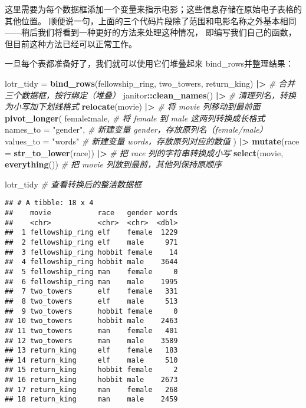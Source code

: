 \documentclass[
]{article}
\newenvironment{Shaded}{\begin{snugshade}}{\end{snugshade}}
\newcommand{\AttributeTok}[1]{\textcolor[rgb]{0.13,0.29,0.53}{#1}}
\newcommand{\CommentTok}[1]{\textcolor[rgb]{0.56,0.35,0.01}{\textit{#1}}}
\newcommand{\FunctionTok}[1]{\textcolor[rgb]{0.13,0.29,0.53}{\textbf{#1}}}
\newcommand{\NormalTok}[1]{#1}
\newcommand{\OtherTok}[1]{\textcolor[rgb]{0.56,0.35,0.01}{#1}}
\newcommand{\SpecialCharTok}[1]{\textcolor[rgb]{0.81,0.36,0.00}{\textbf{#1}}}
\newcommand{\StringTok}[1]{\textcolor[rgb]{0.31,0.60,0.02}{#1}}
\begin{document}
这里需要为每个数据框添加一个变量来指示电影；这些信息存储在原始电子表格的其他位置。
顺便说一句，上面的三个代码片段除了范围和电影名称之外基本相同------稍后我们将看到一种更好的方法来处理这种情况，
即编写我们自己的函数，但目前这种方法已经可以正常工作。

一旦每个表都准备好了，我们就可以使用它们堆叠起来 bind\_rows并整理结果：

\begin{Shaded}
\begin{Highlighting}[]
\NormalTok{lotr\_tidy }\OtherTok{=} 
  \FunctionTok{bind\_rows}\NormalTok{(fellowship\_ring, two\_towers, return\_king) }\SpecialCharTok{|\textgreater{}}        \CommentTok{\# 合并三个数据框，按行绑定（堆叠）}
\NormalTok{  janitor}\SpecialCharTok{::}\FunctionTok{clean\_names}\NormalTok{() }\SpecialCharTok{|\textgreater{}}                                     \CommentTok{\# 清理列名，转换为小写加下划线格式}
  \FunctionTok{relocate}\NormalTok{(movie) }\SpecialCharTok{|\textgreater{}}                                            \CommentTok{\# 将 movie 列移动到最前面}
  \FunctionTok{pivot\_longer}\NormalTok{(}
\NormalTok{    female}\SpecialCharTok{:}\NormalTok{male,                                                }\CommentTok{\# 将 female 到 male 这两列转换成长格式}
    \AttributeTok{names\_to =} \StringTok{"gender"}\NormalTok{,                                        }\CommentTok{\# 新建变量 gender，存放原列名（female/male）}
    \AttributeTok{values\_to =} \StringTok{"words"}                                         \CommentTok{\# 新建变量 words，存放原列对应的数值}
\NormalTok{  ) }\SpecialCharTok{|\textgreater{}} 
  \FunctionTok{mutate}\NormalTok{(}\AttributeTok{race =} \FunctionTok{str\_to\_lower}\NormalTok{(race)) }\SpecialCharTok{|\textgreater{}}                         \CommentTok{\# 把 race 列的字符串转换成小写}
  \FunctionTok{select}\NormalTok{(movie, }\FunctionTok{everything}\NormalTok{())                                  }\CommentTok{\# 把 movie 列放到最前，其他列保持原顺序}

\NormalTok{lotr\_tidy                                                    }\CommentTok{\# 查看转换后的整洁数据框}
\end{Highlighting}
\end{Shaded}

\begin{verbatim}
## # A tibble: 18 x 4
##    movie           race   gender words
##    <chr>           <chr>  <chr>  <dbl>
##  1 fellowship_ring elf    female  1229
##  2 fellowship_ring elf    male     971
##  3 fellowship_ring hobbit female    14
##  4 fellowship_ring hobbit male    3644
##  5 fellowship_ring man    female     0
##  6 fellowship_ring man    male    1995
##  7 two_towers      elf    female   331
##  8 two_towers      elf    male     513
##  9 two_towers      hobbit female     0
## 10 two_towers      hobbit male    2463
## 11 two_towers      man    female   401
## 12 two_towers      man    male    3589
## 13 return_king     elf    female   183
## 14 return_king     elf    male     510
## 15 return_king     hobbit female     2
## 16 return_king     hobbit male    2673
## 17 return_king     man    female   268
## 18 return_king     man    male    2459
\end{verbatim}
\end{document}
